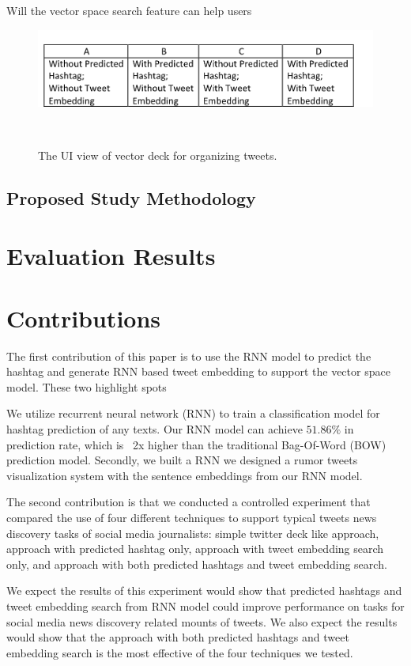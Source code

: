Will the vector space search feature can help users 

\begin{figure}[thb!]
    \includegraphics[width= 1.1 \columnwidth]{images/user_study_plan}
   \caption{The UI view of vector deck for organizing tweets.  } ~\label{fig: vector_deck}
\end{figure}


\subsection{Proposed Study Methodology}



\section{Evaluation Results}


\section{Contributions}

The first contribution of this paper is to use the RNN model to predict the hashtag and generate RNN based tweet embedding to support the vector space model. These two highlight spots 

We utilize recurrent neural network (RNN) to train a classification model for hashtag prediction of any texts. Our RNN model can achieve $51.86\%$ in prediction rate, which is ~2x higher than the traditional Bag-Of-Word (BOW) prediction model. Secondly, we built a RNN we designed a rumor tweets visualization system with the sentence embeddings from our RNN model. 


The second contribution is that we conducted a controlled experiment that compared the use of four different techniques to support typical tweets news discovery tasks of social media journalists: simple twitter deck like approach,  approach with predicted hashtag only, approach with tweet embedding search only,  and approach with both predicted hashtags and tweet embedding search.

We expect the results of this experiment would show that predicted hashtags and tweet embedding search from RNN model could improve performance on tasks for social media news discovery related mounts of tweets. We also expect the results would show that the approach with both predicted hashtags and tweet embedding search is the most effective of the four techniques we tested.












